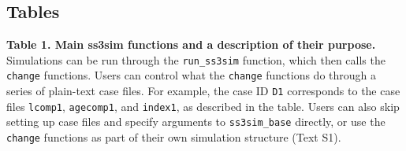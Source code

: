 \documentclass[11pt]{article}
\begin{document}
\begin{spacing}{1.2}
\clearpage

\section*{Tables}

\textbf{Table 1. Main ss3sim functions and a description of their purpose.}
Simulations can be run through the \texttt{run\_ss3sim} function, which then
calls the \texttt{change} functions. Users can control what the \texttt{change}
functions do through a series of plain-text case files. For example, the case
ID \texttt{D1} corresponds to the case files \texttt{lcomp1},
\texttt{agecomp1}, and \texttt{index1}, as described in the table. Users can
also skip setting up case files and specify arguments to \texttt{ss3sim\_base}
directly, or use the \texttt{change} functions as part of their own simulation
structure (Text S1).


\end{spacing}
\end{document}
